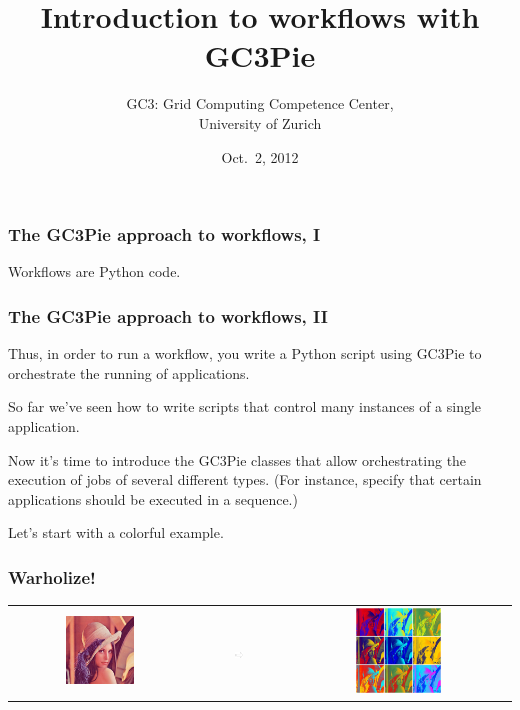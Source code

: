 \documentclass[english,serif,mathserif,xcolor=pdftex,dvipsnames,table]{beamer}
\title[Workflows]{%
  Introduction to workflows with GC3Pie
}
\author[Riccardo Murri]{%
  GC3: Grid Computing Competence Center, \\
  University of Zurich
}
\date{Oct.~2, 2012}
\begin{document}
\maketitle


\begin{frame}
  \frametitle{The GC3Pie approach to workflows, I}

  \begin{center}
    Workflows are Python code.
  \end{center}
\end{frame}


\begin{frame}
  \frametitle{The GC3Pie approach to workflows, II}

  Thus, in order to run a workflow, you write a Python script using
  GC3Pie to orchestrate the running of applications.

\end{frame}


\begin{frame}

So far we've seen how to write scripts that control many instances of
a single application.

\+
Now it's time to introduce the GC3Pie classes that allow
orchestrating the execution of jobs of several different types. (For
instance, specify that certain applications should be executed in a
sequence.)

\+
Let's start with a colorful example.
\end{frame}


\begin{frame}
  \frametitle{Warholize!}

  \begin{tabular}[c]{ccc}
  \includegraphics[width=0.4\textwidth]{fig/lena.jpg}
  &
  \includegraphics[width=0.1\textwidth]{fig/arrow.pdf}
  &
  \includegraphics[width=0.4\textwidth]{fig/warholized_lena.jpg}
  \end{tabular}
\end{frame}
\end{document}
